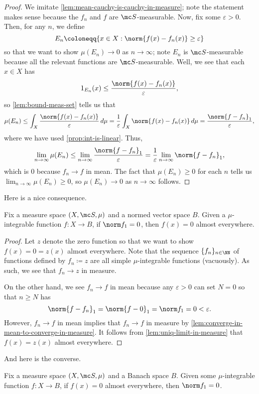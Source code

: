 \documentclass[../notes.tex]{subfiles}
\begin{document}
\begin{proof}
	We imitate \autoref{lem:mean-cauchy-is-cauchy-in-measure}; note the statement makes sense because the $f_n$ and $f$ are $\mc S$-measurable. Now, fix some $\varepsilon>0$. Then, for any $n$, we define
	\[E_{n}\coloneqq\{x\in X:\norm{f(x)-f_n(x)}\ge\varepsilon\}\]
	so that we want to show $\mu(E_n)\to0$ as $n\to\infty$; note $E_n$ is $\mc S$-measurable because all the relevant functions are $\mc S$-measurable. Well, we see that each $x\in X$ has
	\[1_{E_{n}}(x)\le\frac{\norm{f(x)-f_n(x)}}\varepsilon,\]
	so \autoref{lem:bound-meas-set} tells us that
	\[\mu(E_n)\le\int_X\frac{\norm{f(x)-f_n(x)}}\varepsilon\,d\mu=\frac1\varepsilon\int_X\norm{f(x)-f_n(x)}\,d\mu=\frac{\norm{f-f_n}_1}\varepsilon,\]
	where we have used \autoref{prop:int-is-linear}. Thus,
	\[\lim_{n\to\infty}\mu(E_n)\le\lim_{n\to\infty}\frac{\norm{f-f_n}_1}\varepsilon=\frac1\varepsilon\lim_{n\to\infty}\norm{f-f_n}_1,\]
	which is $0$ because $f_n\to f$ in mean. The fact that $\mu(E_n)\ge0$ for each $n$ tells us $\lim_{n\to\infty}\mu(E_n)\ge0$, so $\mu(E_n)\to0$ as $n\to\infty$ follows.
\end{proof}
Here is a nice consequence.
\begin{lemma} \label{lem:norm-zero-to-zero}
	Fix a measure space $(X,\mc S,\mu)$ and a normed vector space $B$. Given a $\mu$-integrable function $f\colon X\to B$, if $\norm f_1=0$, then $f(x)=0$ almost everywhere.
\end{lemma}
\begin{proof}
	Let $z$ denote the zero function so that we want to show $f(x)=0=z(x)$ almost everywhere. Note that the sequence $\{f_n\}_{n\in\NN}$ of functions defined by $f_n\coloneqq z$ are all simple $\mu$-integrable functions (vacuously). As such, we see that $f_n\to z$ in measure.
	
	On the other hand, we see $f_n\to f$ in mean because any $\varepsilon>0$ can set $N=0$ so that $n\ge N$ has
	\[\norm{f-f_n}_1=\norm{f-0}_1=\norm f_1=0<\varepsilon.\]
	However, $f_n\to f$ in mean implies that $f_n\to f$ in measure by \autoref{lem:converge-in-mean-to-converge-in-measure}. It follows from \autoref{lem:uniq-limit-in-measure} that $f(x)=z(x)$ almost everywhere.
\end{proof}
And here is the converse.
\begin{lemma} \label{lem:zero-to-norm-zero}
	Fix a measure space $(X,\mc S,\mu)$ and a Banach space $B$. Given some $\mu$-integrable function $f\colon X\to B$, if $f(x)=0$ almost everywhere, then $\norm f_1=0$.
\end{lemma}
\end{document}
